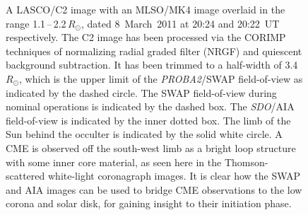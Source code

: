 \documentclass[namedreferences]{solarphysics}
\begin{document}
\begin{article}
\begin{figure}[ht]
\caption{A LASCO/C2 image with an MLSO/MK4 image overlaid in the range 1.1\,--\,2.2\,$R_\odot$, dated 8~March~2011 at 20:24 and 20:22~UT respectively. The C2 image has been processed via the CORIMP techniques of normalizing radial graded filter (NRGF) and quiescent background subtraction. It has been trimmed to a half-width of 3.4\,$R_\odot$, which is the upper limit of the \emph{PROBA2}/SWAP field-of-view as indicated by the dashed circle. The SWAP field-of-view during nominal operations is indicated by the dashed box. The \emph{SDO}/AIA field-of-view is indicated by the inner dotted box. The limb of the Sun behind the occulter is indicated by the solid white circle. A CME is observed off the south-west limb as a bright loop structure with some inner core material, as seen here in the Thomson-scattered white-light coronagraph images. It is clear how the SWAP and AIA images can be used to bridge CME observations to the low corona and solar disk, for gaining insight to their initiation phase.}
\label{overlays}
\end{figure}


\end{article}
\end{document}
